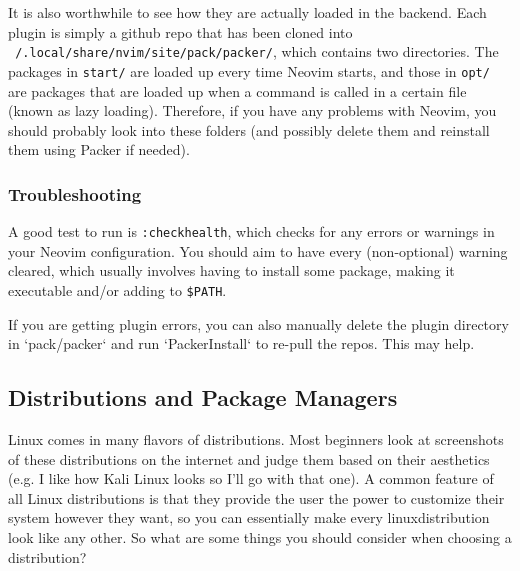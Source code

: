 \documentclass{article}
\theoremstyle{definition}
\begin{document}
      It is also worthwhile to see how they are actually loaded in the backend. Each plugin is simply a github repo that has been cloned into \texttt{~/.local/share/nvim/site/pack/packer/}, which contains two directories. The packages in \texttt{start/} are loaded up every time Neovim starts, and those in \texttt{opt/} are packages that are loaded up when a command is called in a certain file (known as lazy loading). Therefore, if you have any problems with Neovim, you should probably look into these folders (and possibly delete them and reinstall them using Packer if needed).

    \subsubsection{Troubleshooting}

      A good test to run is \texttt{:checkhealth}, which checks for any errors or warnings in your Neovim configuration. You should aim to have every (non-optional) warning cleared, which usually involves having to install some package, making it executable and/or adding to \texttt{\$PATH}. 

      If you are getting plugin errors, you can also manually delete the plugin directory in `pack/packer` and run `PackerInstall` to re-pull the repos. This may help. 

  \subsection{Distributions and Package Managers}
    
    Linux comes in many flavors of distributions. Most beginners look at screenshots of these distributions on the internet and judge them based on their aesthetics (e.g. I like how Kali Linux looks so I'll go with that one). A common feature of all Linux distributions is that they provide the user the power to customize their system however they want, so you can essentially make every linuxdistribution look like any other. So what are some things you should consider when choosing a distribution? 
  
\end{document}
